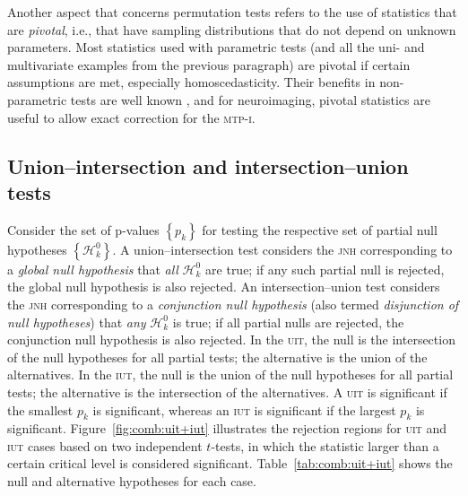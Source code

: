 Another aspect that concerns permutation tests refers to the use of statistics that are \emph{pivotal}, i.e., that have sampling distributions that do not depend on unknown parameters. Most statistics used with parametric tests (and all the uni- and multivariate examples from the previous paragraph) are pivotal if certain assumptions are met, especially homoscedasticity. Their benefits in non-parametric tests are well known \citep{Hall1991}, and for neuroimaging, pivotal statistics are useful to allow exact correction for the \textsc{mtp-i}.

\subsection{Union--intersection and intersection--union tests}
\label{sec:comb:uit+iut}

Consider the set of p-values $\left\{p_{k}\right\}$ for testing the respective set of partial null hypotheses $\left\{\mathcal{H}^{0}_{k}\right\}$. A union--intersection test \citep[\textsc{uit},][]{Roy1953} considers the \textsc{jnh} corresponding to a \emph{global null hypothesis} that \emph{all} $\mathcal{H}^{0}_{k}$ are true; if any such partial null is rejected, the global null hypothesis is also rejected. 
An intersection--union test \citep[\textsc{iut},][]{Berger1982} considers the \textsc{jnh} corresponding to a \emph{conjunction null hypothesis} (also termed \emph{disjunction of null hypotheses}) that \emph{any} $\mathcal{H}^{0}_{k}$ is true; if all partial nulls are rejected, the conjunction null hypothesis is also rejected. In the \textsc{uit}, the null is the intersection of the null hypotheses for all partial tests; the alternative is the union of the alternatives. In the \textsc{iut}, the null is the union of the null hypotheses for all partial tests; the alternative is the intersection of the alternatives. A \textsc{uit} is significant if the smallest $p_{k}$ is significant, whereas an \textsc{iut} is significant if the largest $p_{k}$ is significant. Figure~\ref{fig:comb:uit+iut} illustrates the rejection regions for \textsc{uit} and \textsc{iut} cases based on two independent $t$-tests, in which the statistic larger than a certain critical level is considered significant. Table~\ref{tab:comb:uit+iut} shows the null and alternative hypotheses for each case.

